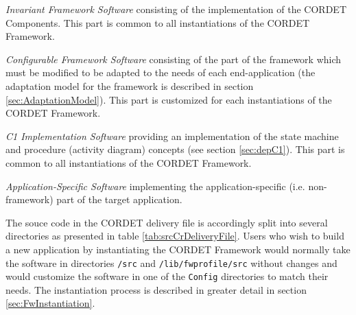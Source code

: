 \documentclass[a4paper,10pt]{article}
\newenvironment{fw_itemize}						%
{\begin{itemize}
  \setlength{\itemsep}{1mm}
  \setlength{\parskip}{0pt}
  \setlength{\parsep}{0pt}}
{\end{itemize}}
\begin{document}
\begin{fw_itemize}
\item \textit{Invariant Framework Software} consisting of the implementation of the CORDET Components. This part is common to all instantiations of the CORDET Framework. 
\item \textit{Configurable Framework Software} consisting of the part of the framework which must be modified to be adapted to the needs of each end-application (the adaptation model for the framework is described in section \ref{sec:AdaptationModel}). This part is customized for each instantiations of the CORDET Framework. 
\item \textit{C1 Implementation Software} providing an implementation of the state machine and procedure (activity diagram) concepts (see section \ref{sec:depC1}). This part is common to all instantiations of the CORDET Framework.
\item \textit{Application-Specific Software} implementing the application-specific (i.e. non-framework) part of the target application. 
\end{fw_itemize}

The souce code in the CORDET delivery file is accordingly split into several directories as presented in table \ref{tab:srcCrDeliveryFile}. Users who wish to build a new application by instantiating the CORDET Framework would normally take the software in directories \texttt{/src} and \texttt{/lib/fwprofile/src} without changes and would customize the software in one of the \texttt{Config} directories to match their needs. The instantiation process is described in greater detail in section \ref{sec:FwInstantiation}.
\end{document}

